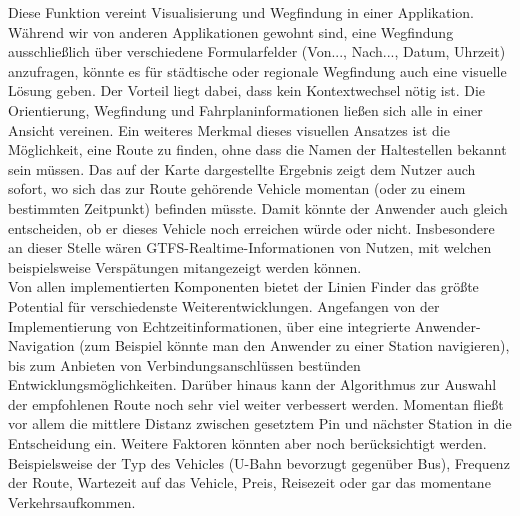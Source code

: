     Diese Funktion vereint Visualisierung und Wegfindung in einer Applikation. Während wir von anderen Applikationen gewohnt sind, eine Wegfindung ausschließlich über verschiedene Formularfelder (Von..., Nach..., Datum, Uhrzeit) anzufragen, könnte es für städtische oder regionale Wegfindung auch eine visuelle Lösung geben. Der Vorteil liegt dabei, dass kein Kontextwechsel nötig ist. Die Orientierung, Wegfindung und Fahrplaninformationen ließen sich alle in einer Ansicht vereinen. Ein weiteres Merkmal dieses visuellen Ansatzes ist die Möglichkeit, eine Route zu finden, ohne dass die Namen der Haltestellen bekannt sein müssen. Das auf der Karte dargestellte Ergebnis zeigt dem Nutzer auch sofort, wo sich das zur Route gehörende Vehicle momentan (oder zu einem bestimmten Zeitpunkt) befinden müsste. Damit könnte der Anwender auch gleich entscheiden, ob er dieses Vehicle noch erreichen würde oder nicht. Insbesondere an dieser Stelle wären GTFS-Realtime-Informationen von Nutzen, mit welchen beispielsweise Verspätungen mitangezeigt werden können.\\

    Von allen implementierten Komponenten bietet der Linien Finder das größte Potential für verschiedenste Weiterentwicklungen. Angefangen von der Implementierung von Echtzeitinformationen, über eine integrierte Anwender-Navigation (zum Beispiel könnte man den Anwender zu einer Station navigieren), bis zum Anbieten von Verbindungsanschlüssen bestünden Entwicklungsmöglichkeiten. Darüber hinaus kann der Algorithmus zur Auswahl der empfohlenen Route noch sehr viel weiter verbessert werden. Momentan fließt vor allem die mittlere Distanz zwischen gesetztem Pin und nächster Station in die Entscheidung ein. Weitere Faktoren könnten aber noch berücksichtigt werden. Beispielsweise der Typ des Vehicles (U-Bahn bevorzugt gegenüber Bus), Frequenz der Route, Wartezeit auf das Vehicle, Preis, Reisezeit oder gar das momentane Verkehrsaufkommen.
    
    
    

